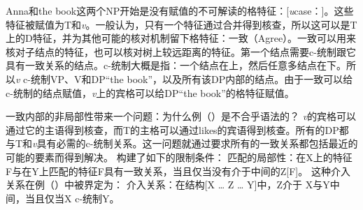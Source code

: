 Anna和the book这两个NP开始是没有赋值的不可解读的格特征：[\textit{u}case：]。这些特征被赋值为T和\textit{v}。一般认为，只有一个特征通过合并得到核查，所以这可以是T上的D特征，并为其他可能的核对机制留下格特征：一致（Agree）。一致可以用来核对子结点的特征，也可以核对树上较远距离的特征。第一个结点需要c-统制跟它具有一致关系的结点。c-统制大概是指：一个结点在上，然后任意多结点在下。所以\textit{v} c-统制VP、V和DP“the book”，以及所有该DP内部的结点。由于一致可以给c-统制的结点赋值，\textit{v}上的宾格可以给DP“the book”的格特征赋值。

一致内部的非局部性带来一个问题：为什么例（）是不合乎语法的？
\z
\textit{v}的宾格可以通过它的主语得到核查，而T的主格可以通过likes的宾语得到核查。所有的DP都与T和\textit{v}具有必需的c-统制关系。这一问题就通过要求所有的一致关系都包括最近的可能的要素而得到解决。 \citet[]{Adger2003a}构建了如下的限制条件：
\ea
\label{principle-locality-of-matching}
匹配的局部性：在X上的特征F与在Y上匹配的特征F具有一致关系，当且仅当没有介于中间的Z[F]。
\z
这种介入关系在例（）中被界定为：
\ea
\label{def-intervention}
介入关系：在结构[X \ldots{} Z \ldots{} Y]中，Z介于 X与Y中间，当且仅当X c-统制Y。
\z

